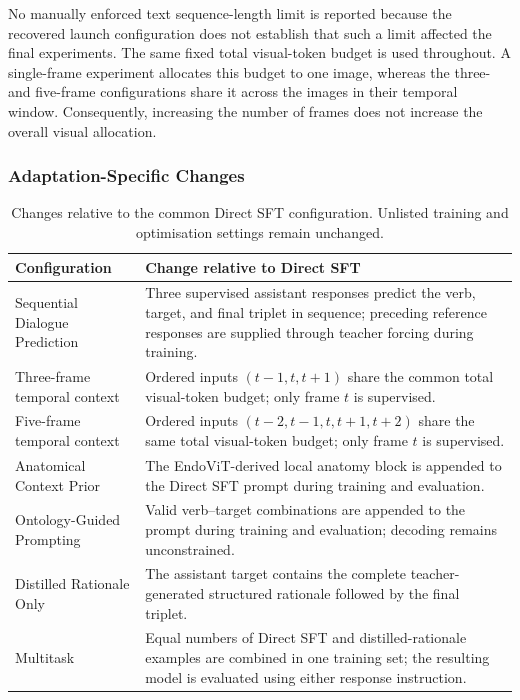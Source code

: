 No manually enforced text sequence-length limit is reported because the recovered launch configuration does not establish that such a limit affected the final experiments. The same fixed total visual-token budget is used throughout. A single-frame experiment allocates this budget to one image, whereas the three- and five-frame configurations share it across the images in their temporal window. Consequently, increasing the number of frames does not increase the overall visual allocation.

\subsubsection{Adaptation-Specific Changes}

\begin{table}[htb!]
\centering
\caption{Changes relative to the common Direct SFT configuration. Unlisted training and optimisation settings remain unchanged.}
\label{tab:c5:adaptation-training-changes}
\begin{tabular}{p{}p{}}
\toprule
Configuration & Change relative to Direct SFT \\
\midrule
Sequential Dialogue Prediction & Three supervised assistant responses predict the verb, target, and final triplet in sequence; preceding reference responses are supplied through teacher forcing during training. \\
Three-frame temporal context & Ordered inputs $(t-1,t,t+1)$ share the common total visual-token budget; only frame $t$ is supervised. \\
Five-frame temporal context & Ordered inputs $(t-2,t-1,t,t+1,t+2)$ share the same total visual-token budget; only frame $t$ is supervised. \\
Anatomical Context Prior & The EndoViT-derived local anatomy block is appended to the Direct SFT prompt during training and evaluation. \\
Ontology-Guided Prompting & Valid verb--target combinations are appended to the prompt during training and evaluation; decoding remains unconstrained. \\
Distilled Rationale Only & The assistant target contains the complete teacher-generated structured rationale followed by the final triplet. \\
Multitask & Equal numbers of Direct SFT and distilled-rationale examples are combined in one training set; the resulting model is evaluated using either response instruction. \\
\bottomrule
\end{tabular}
\end{table}

